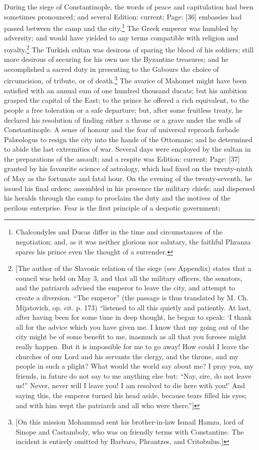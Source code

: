 During the siege of Constantinople, the words of peace and capitulation had been sometimes pronounced; and several Edition: current; Page: [36] embassies had passed between the camp and the city.\footnote{Chalcondyles and Ducas differ in the time and circumstances of the negotiation; and, as it was neither glorious nor salutary, the faithful Phranza spares his prince even the thought of a surrender.} The Greek emperor was humbled by adversity; and would have yielded to any terms compatible with religion and royalty.\footnote{[The author of the Slavonic relation of the siege (see Appendix) states that a council was held on May 3, and that all the military officers, the senators, and the patriarch advised the emperor to leave the city, and attempt to create a diversion. \texthebrew{“}The emperor\texthebrew{}” (the passage is thus translated by M. Ch. Mijatovich, op. cit. p. 173) \texthebrew{“}listened to all this quietly and patiently. At last, after having been for some time in deep thought, he began to speak: \texthebrew{‘}I thank all for the advice which you have given me. I know that my going out of the city might be of some benefit to me, inasmuch as all that you foresee might really happen. But it is impossible for me to go away! How could I leave the churches of our Lord and his servants the clergy, and the throne, and my people in such a plight? What would the world say about me? I pray you, my friends, in future do not say to me anything else but: \texthebrew{“}Nay, sire, do not leave us!\texthebrew{}” Never, never will I leave you! I am resolved to die here with you!\texthebrew{}’ And saying this, the emperor turned his head aside, because tears filled his eyes; and with him wept the patriarch and all who were there.\texthebrew{}”]} The Turkish sultan was desirous of sparing the blood of his soldiers; still more desirous of securing for his own use the Byzantine treasures; and he accomplished a sacred duty in presenting to the Gabours the choice of circumcision, of tribute, or of death.\footnote{[On this mission Mohammad sent his brother-in-law Ismail Hamza, lord of Sinope and Castamboly, who was on friendly terms with Constantine. The incident is entirely omitted by Barbaro, Phrantzes, and Critobulus.]} The avarice of Mahomet might have been satisfied with an annual sum of one hundred thousand ducats; but his ambition grasped the capital of the East; to the prince he offered a rich equivalent, to the people a free toleration or a safe departure; but, after some fruitless treaty, he declared his resolution of finding either a throne or a grave under the walls of Constantinople. A sense of honour and the fear of universal reproach forbade Palæologus to resign the city into the hands of the Ottomans; and he determined to abide the last extremities of war. Several days were employed by the sultan in the preparations of the assault; and a respite was Edition: current; Page: [37] granted by his favourite science of astrology, which had fixed on the twenty-ninth of May as the fortunate and fatal hour. On the evening of the twenty-seventh, he issued his final orders; assembled in his presence the military chiefs; and dispersed his heralds through the camp to proclaim the duty and the motives of the perilous enterprise. Fear is the first principle of a despotic government; 